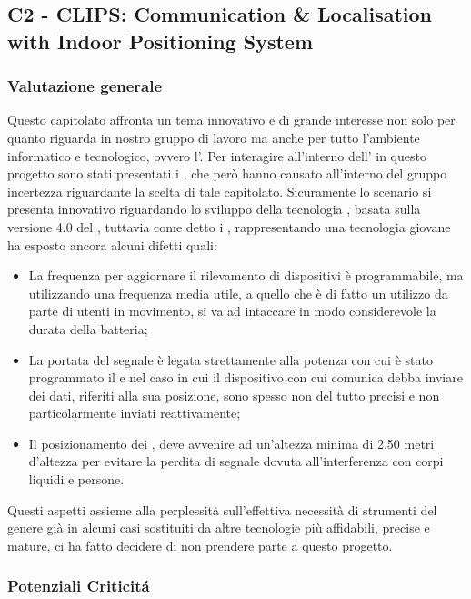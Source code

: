 \subsection{C2 - CLIPS: Communication \& Localisation with Indoor Positioning System}
\subsubsection{Valutazione generale}
Questo capitolato affronta un tema innovativo e di grande interesse non solo per quanto riguarda in nostro gruppo di lavoro ma anche per tutto l'ambiente informatico e tecnologico, ovvero l'.
Per interagire all'interno dell' in questo progetto sono stati presentati i , che per\`o hanno causato all'interno del gruppo incertezza riguardante la scelta di tale capitolato.
Sicuramente lo scenario si presenta innovativo riguardando lo sviluppo della tecnologia , basata sulla versione 4.0 del , tuttavia come detto i , rappresentando una tecnologia giovane ha esposto ancora alcuni difetti quali:
\begin{itemize}
	\item La frequenza per aggiornare il rilevamento di dispositivi \`e programmabile, ma utilizzando una frequenza media utile, a quello che \`e di fatto un utilizzo da parte di utenti in movimento, si va ad intaccare in modo considerevole la durata della batteria;
	\item La portata del segnale \`e legata strettamente alla potenza con cui \`e stato programmato il  e nel caso in cui il dispositivo con cui comunica debba inviare dei dati, riferiti alla sua posizione, sono spesso non del tutto precisi e non particolarmente inviati reattivamente;
	\item Il posizionamento dei , deve avvenire ad un'altezza minima di 2.50 metri d'altezza per evitare la perdita di segnale dovuta all'interferenza con corpi liquidi e persone.
\end{itemize}
Questi aspetti assieme alla perplessit\`a sull'effettiva necessit\`a di strumenti del genere gi\`a in alcuni casi sostituiti da altre tecnologie pi\`u affidabili, precise e mature, ci ha fatto decidere di non prendere parte a questo progetto.

\subsubsection{Potenziali Criticit\'a}

